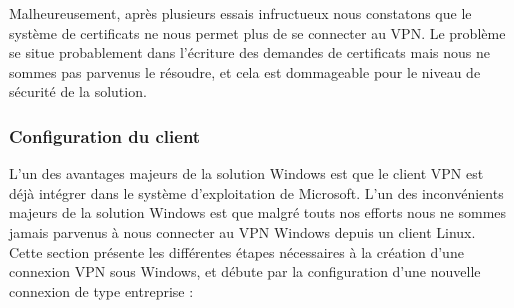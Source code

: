Malheureusement, après plusieurs essais infructueux nous constatons que le système de certificats ne nous permet plus de se connecter au VPN. Le problème se situe probablement dans l'écriture des demandes de certificats mais nous ne sommes pas parvenus le résoudre, et cela est dommageable pour le niveau de sécurité de la solution.

\subsubsection{Configuration du client}

L'un des avantages majeurs de la solution Windows est que le client VPN est déjà intégrer dans le système d'exploitation de Microsoft. L'un des inconvénients majeurs de la solution Windows est que malgré touts nos efforts nous ne sommes jamais parvenus à nous connecter au VPN Windows depuis un client Linux. Cette section présente les différentes étapes nécessaires à la création d'une connexion VPN sous Windows, et débute par la configuration d'une nouvelle connexion de type entreprise :

